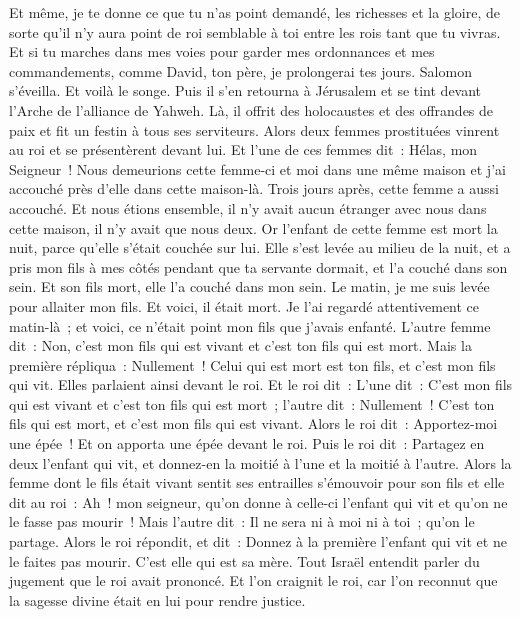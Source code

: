 \begin{multicols}{2}
Et même, je te donne ce que tu n'as point demandé, les richesses et la gloire, de sorte qu'il n'y aura point de roi semblable à toi entre les rois tant que tu vivras.
Et si tu marches dans mes voies pour garder mes ordonnances et mes commandements, comme David, ton père, je prolongerai tes jours.
Salomon s'éveilla. Et voilà le songe. Puis il s'en retourna à Jérusalem et se tint devant l'Arche de l'alliance de Yahweh. Là, il offrit des holocaustes et des offrandes de paix et fit un festin à tous ses serviteurs.
Alors deux femmes prostituées vinrent au roi et se présentèrent devant lui.
Et l'une de ces femmes dit~: Hélas, mon Seigneur~! Nous demeurions cette femme-ci et moi dans une même maison et j'ai accouché près d'elle dans cette maison-là.
Trois jours après, cette femme a aussi accouché. Et nous étions ensemble, il n'y avait aucun étranger avec nous dans cette maison, il n'y avait que nous deux.
Or l'enfant de cette femme est mort la nuit, parce qu'elle s'était couchée sur lui.
Elle s'est levée au milieu de la nuit, et a pris mon fils à mes côtés pendant que ta servante dormait, et l'a couché dans son sein. Et son fils mort, elle l'a couché dans mon sein.
Le matin, je me suis levée pour allaiter mon fils. Et voici, il était mort. Je l'ai regardé attentivement ce matin-là~; et voici, ce n'était point mon fils que j'avais enfanté.
L'autre femme dit~: Non, c'est mon fils qui est vivant et c'est ton fils qui est mort. Mais la première répliqua~: Nullement~! Celui qui est mort est ton fils, et c'est mon fils qui vit. Elles parlaient ainsi devant le roi.
Et le roi dit~: L'une dit~: C'est mon fils qui est vivant et c'est ton fils qui est mort~; l'autre dit~: Nullement~! C'est ton fils qui est mort, et c'est mon fils qui est vivant.
Alors le roi dit~: Apportez-moi une épée~! Et on apporta une épée devant le roi.
Puis le roi dit~: Partagez en deux l'enfant qui vit, et donnez-en la moitié à l'une et la moitié à l'autre.
Alors la femme dont le fils était vivant sentit ses entrailles s'émouvoir pour son fils et elle dit au roi~: Ah~! mon seigneur, qu'on donne à celle-ci l'enfant qui vit et qu'on ne le fasse pas mourir~! Mais l'autre dit~: Il ne sera ni à moi ni à toi~; qu'on le partage.
Alors le roi répondit, et dit~: Donnez à la première l'enfant qui vit et ne le faites pas mourir. C'est elle qui est sa mère.
Tout Israël entendit parler du jugement que le roi avait prononcé. Et l'on craignit le roi, car l'on reconnut que la sagesse divine était en lui pour rendre justice.

\end{multicols}
